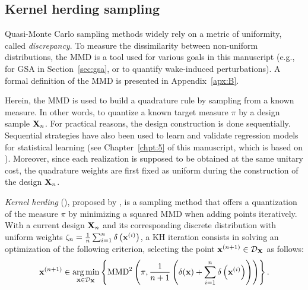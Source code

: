 \subsection{Kernel herding sampling}\label{sec:4khsubsec}

Quasi-Monte Carlo sampling methods widely rely on a metric of uniformity, called \textit{discrepancy}. 
To measure the dissimilarity between non-uniform distributions, the MMD is a tool used for various goals in this manuscript (e.g., for GSA in Section~\ref{sec:gsa}, or to quantify wake-induced perturbations).  
A formal definition of the MMD is presented in Appendix~\ref{apx:B}. 

Herein, the MMD is used to build a quadrature rule by sampling from a known measure. 
In other words, to quantize a known target measure $\pi$ by a design sample ${\bf X}_n$. 
For practical reasons, the design construction is done sequentially. 
Sequential strategies have also been used to learn and validate regression models for statistical learning (see Chapter~\ref{chpt:5} of this manuscript, which is based on \citealp{fekhari_iooss_2023}). 
Moreover, since each realization is supposed to be obtained at the same unitary cost, the quadrature weights are first fixed as uniform during the construction of the design ${\bf X}_n$.

\emph{Kernel herding} (), proposed by \cite{chen_welling_2010}, is a sampling method that offers a quantization of the measure $\pi$ by minimizing a squared MMD when adding points iteratively. 
With a current design ${\bf X}_n$ and its corresponding discrete distribution with uniform weights $\zeta_n= \frac{1}{n} \sum_{i=1}^{n} \delta\left({\bf x}^{(i)}\right)$, a KH iteration consists in solving an optimization of the following criterion, selecting the point ${\bf x}^{(n+1)} \in \mathcal{D}_{{\bf X}}$ as follows:
\begin{align}
   {\bf x}^{(n+1)} \in \operatorname*{arg\,min}_{{\bf x} \in \mathcal{D}_{{\bf X}}} \left\{\mathrm{MMD}^2\left(\pi, \frac{1}{n+1} \left(\delta({\bf x}) + \sum_{i=1}^{n} \delta\left({\bf x}^{(i)}\right)\right)\right)\right\}.
   \label{eq:mmd_criterion}
\end{align}

